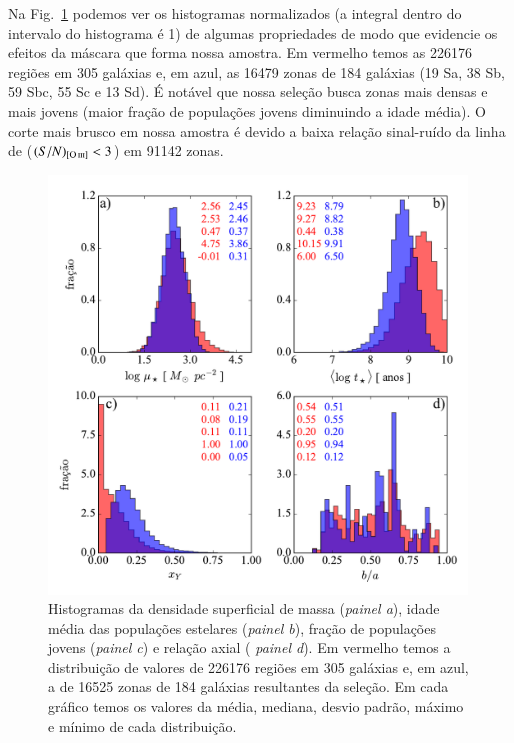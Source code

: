 Na Fig.\ \ref{fig:histosample} podemos ver os histogramas normalizados (a integral dentro do
intervalo do histograma é 1) de algumas propriedades de modo que evidencie os efeitos da máscara
que forma nossa amostra. Em vermelho temos as 226176 regiões em 305 galáxias e, em azul, as 16479
zonas de 184 galáxias (19 Sa, 38 Sb, 59 Sbc, 55 Sc e 13 Sd). É notável que nossa seleção busca zonas
mais densas e mais jovens (maior fração de populações jovens diminuindo a idade média). O corte mais
brusco em nossa amostra é devido a baixa relação sinal-ruído da linha de \oIII ($(S/N)_{\oIII} < 3$)
em 91142 zonas.
\begin{figure}
	\centering
	\includegraphics[width=0.99\textwidth]{figuras/histosample.pdf}
	\caption[Histogramas: densidade superficial de massa, idade média, fração de populações jovens e
	relação axial.] 
	{Histogramas da densidade superficial de massa ({\em painel a}), idade média das populações
estelares ({\em painel b}), fração de populações jovens ({\em painel c}) e relação axial ({\em
painel d}). Em vermelho temos a distribuição de valores de 226176 regiões em 305 galáxias e, em
azul, a de 16525 zonas de 184 galáxias resultantes da seleção. Em cada gráfico temos os valores da
média, mediana, desvio padrão, máximo e mínimo de cada distribuição.}
	\label{fig:histosample}
\end{figure}


